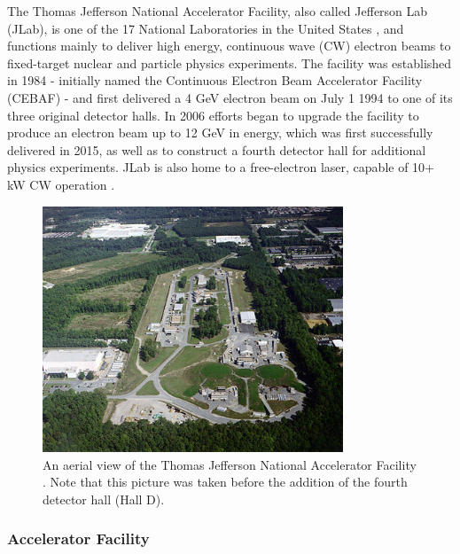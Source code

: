 The Thomas Jefferson National Accelerator Facility, also called Jefferson Lab (JLab), is one of the 17 National Laboratories in the United States \parencite{DepartmentofEnergy2023DepartmentLaboratories}, and functions mainly to deliver high energy, continuous wave (CW) electron beams to fixed-target nuclear and particle physics experiments. The facility was established in 1984 - initially named the Continuous Electron Beam Accelerator Facility (CEBAF) - and first delivered a 4 GeV electron beam on July 1 1994 to one of its three original detector halls. In 2006 efforts began to upgrade the facility to produce an electron beam up to 12 GeV in energy, which was first successfully delivered in 2015, as well as to construct a fourth detector hall for additional physics experiments\parencite{JeffersonLab2023AboutLab}. JLab is also home to a free-electron laser, capable of 10+ kW CW operation \parencite{Benson2007HighAccelerator}. 

\begin{figure}[ht]
    \centering
    \includegraphics[width=0.8\textwidth]{Chapters/Ch2-Experiment/accel_and_beamline/pics/CEBAF/jlab_wiki.png}
    \caption{An aerial view of the Thomas Jefferson National Accelerator Facility \parencite{Wang2010CEBAFOverview}. Note that this picture was taken before the addition of the fourth detector hall (Hall D).}
    \label{fig:jlab_wiki}
\end{figure}

\subsubsection{Accelerator Facility}
    
